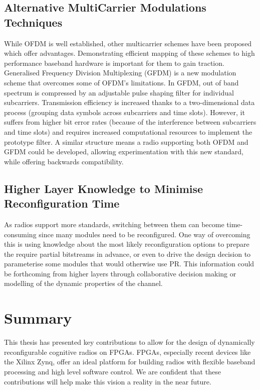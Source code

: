 \subsection{Alternative MultiCarrier Modulations Techniques}
While OFDM is well established, other multicarrier schemes have been proposed which offer advantages. Demonstrating efficient mapping of these schemes to high performance baseband hardware is important for them to gain traction.
Generalised Frequency Division Multiplexing (GFDM) is a new modulation scheme that overcomes some of OFDM's limitations.
In GFDM, out of band spectrum is compressed by an adjustable pulse shaping filter for individual subcarriers. Transmission efficiency is increased thanks to a two-dimensional data process (grouping data symbols across subcarriers and time slots).
However, it suffers from higher bit error rates (because of the interference between subcarriers and time slots) and requires increased computational resources to implement the prototype filter.
A similar structure means a radio supporting both OFDM and GFDM could be developed, allowing experimentation with this new standard, while offering backwards compatibility.

\subsection{Higher Layer Knowledge to Minimise Reconfiguration Time}
As radios support more standards, switching between them can become time-consuming since many modules need to be reconfigured. One way of overcoming this is using knowledge about the most likely reconfiguration options to prepare the require partial bitstreams in advance, or even to drive the design decision to parameterise some modules that would otherwise use PR.
This information could be forthcoming from higher layers through collaborative decision making or modelling of the dynamic properties of the channel.

\section{Summary}

This thesis has presented key contributions to allow for the design of dynamically reconfigurable cognitive radios on FPGAs. FPGAs, especially recent devices like the Xilinx Zynq, offer an ideal platform for building radios with flexible baseband processing and high level software control. We are confident that these contributions will help make this vision a reality in the near future.
